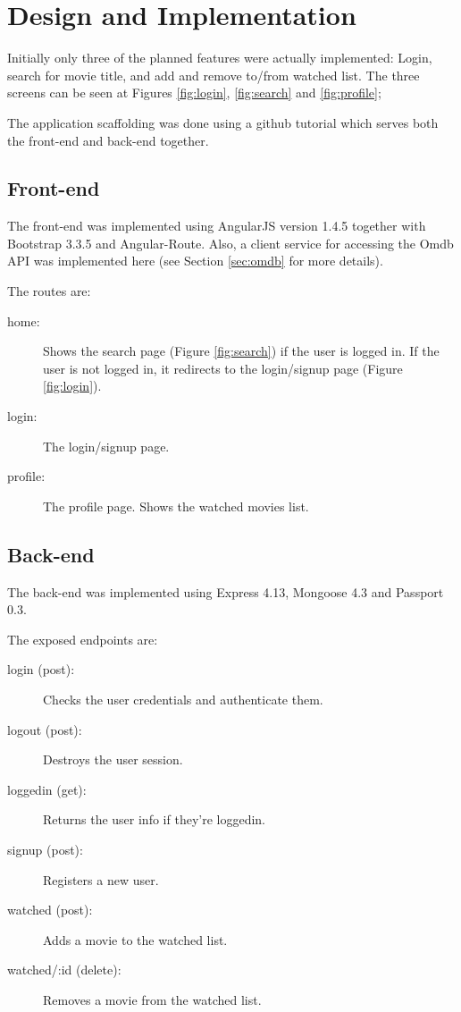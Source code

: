 \section{Design and Implementation}

Initially only three of the planned features were actually implemented: Login,
search for movie title, and add and remove to/from watched list. The three
screens can be seen at Figures \ref{fig:login}, \ref{fig:search} and
\ref{fig:profile};

The application scaffolding was done using a github tutorial \cite{githubtuto}
which serves both the front-end and back-end together.

\subsection{Front-end}

The front-end was implemented using AngularJS version 1.4.5 together with
Bootstrap 3.3.5 and Angular-Route. Also, a client service for accessing the
Omdb API was implemented here (see Section \ref{sec:omdb} for more details).

The routes are:

\begin{description}
  \item[home:] Shows the search page (Figure \ref{fig:search}) if the user is
    logged in. If the user is not logged in, it redirects to the login/signup
    page (Figure \ref{fig:login}).
  \item[login:] The login/signup page.
  \item[profile:] The profile page. Shows the watched movies list.
\end{description}

\subsection{Back-end}

The back-end was implemented using Express 4.13, Mongoose 4.3 and Passport 0.3.

The exposed endpoints are:

\begin{description}
  \item[login (post):] Checks the user credentials and authenticate them.
  \item[logout (post):] Destroys the user session.
  \item[loggedin (get):] Returns the user info if they're loggedin.
  \item[signup (post):] Registers a new user.
  \item[watched (post):] Adds a movie to the watched list.
  \item[watched/:id (delete):] Removes a movie from the watched list.
\end{description}

